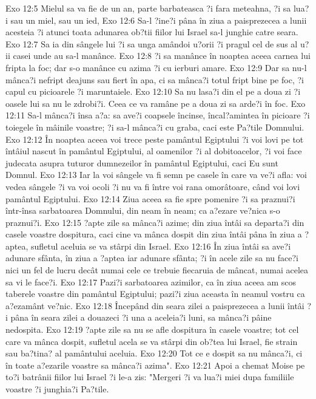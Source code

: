 Exo 12:5  Mielul sa va fie de un an, parte barbateasca ?i fara meteahna, ?i sa lua?i sau un miel, sau un ied,
Exo 12:6  Sa-l ?ine?i pâna în ziua a paisprezecea a lunii acesteia ?i atunci toata adunarea ob?tii fiilor lui Israel sa-l junghie catre seara.
Exo 12:7  Sa ia din sângele lui ?i sa unga amândoi u?orii ?i pragul cel de sus al u?ii casei unde au sa-l manânce.
Exo 12:8  ?i sa manânce în noaptea aceea carnea lui fripta la foc; dar s-o manânce cu azima ?i cu ierburi amare.
Exo 12:9  Dar sa nu-l mânca?i nefript deajuns sau fiert în apa, ci sa mânca?i totul fript bine pe foc, ?i capul cu picioarele ?i maruntaiele.
Exo 12:10  Sa nu lasa?i din el pe a doua zi ?i oasele lui sa nu le zdrobi?i. Ceea ce va ramâne pe a doua zi sa arde?i în foc.
Exo 12:11  Sa-l mânca?i însa a?a: sa ave?i coapsele încinse, încal?amintea în picioare ?i toiegele în mâinile voastre; ?i sa-l mânca?i cu graba, caci este Pa?tile Domnului.
Exo 12:12  În noaptea aceea voi trece peste pamântul Egiptului ?i voi lovi pe tot întâiul nascut în pamântul Egiptului, al oamenilor ?i al dobitoacelor, ?i voi face judecata asupra tuturor dumnezeilor în pamântul Egiptului, caci Eu sunt Domnul.
Exo 12:13  Iar la voi sângele va fi semn pe casele în care va ve?i afla: voi vedea sângele ?i va voi ocoli ?i nu va fi între voi rana omorâtoare, când voi lovi pamântul Egiptului.
Exo 12:14  Ziua aceea sa fie spre pomenire ?i sa praznui?i într-însa sarbatoarea Domnului, din neam în neam; ca a?ezare ve?nica s-o praznui?i.
Exo 12:15  ?apte zile sa mânca?i azime; din ziua întâi sa departa?i din casele voastre dospitura, caci cine va mânca dospit din ziua întâi pâna în ziua a ?aptea, sufletul aceluia se va stârpi din Israel.
Exo 12:16  În ziua întâi sa ave?i adunare sfânta, în ziua a ?aptea iar adunare sfânta; ?i în acele zile sa nu face?i nici un fel de lucru decât numai cele ce trebuie fiecaruia de mâncat, numai acelea sa vi le face?i.
Exo 12:17  Pazi?i sarbatoarea azimilor, ca în ziua aceea am scos taberele voastre din pamântul Egiptului; pazi?i ziua aceasta în neamul vostru ca a?ezamânt ve?nic.
Exo 12:18  Începând din seara zilei a paisprezecea a lunii întâi ?i pâna în seara zilei a douazeci ?i una a aceleia?i luni, sa mânca?i pâine nedospita.
Exo 12:19  ?apte zile sa nu se afle dospitura în casele voastre; tot cel care va mânca dospit, sufletul acela se va stârpi din ob?tea lui Israel, fie strain sau ba?tina? al pamântului aceluia.
Exo 12:20  Tot ce e dospit sa nu mânca?i, ci în toate a?ezarile voastre sa mânca?i azima".
Exo 12:21  Apoi a chemat Moise pe to?i batrânii fiilor lui Israel ?i le-a zis: "Mergeri ?i va lua?i miei dupa familiile voastre ?i junghia?i Pa?tile.
